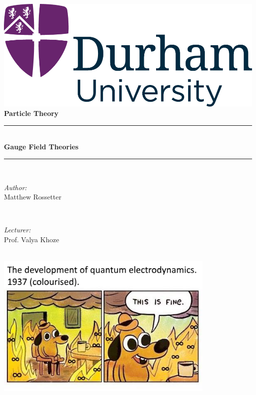 \documentclass[a4paper, 11pt, normalem]{report}
\begin{document}
\begin{titlepage}
    \newcommand{\HRule}{\rule{\linewidth}{0.5mm}}
    \center
    {\includegraphics[scale=0.5]{../../logo0.png}\hfill{\Large\bfseries {}}}\\[2.5cm]
    {\LARGE\bfseries Particle Theory}\\[1.5cm]
    \HRule \\[0.7cm]
    {\huge\bfseries Gauge Field Theories}\\[0.4cm]
    \HRule \\[1.5cm]

    \begin{minipage}{0.4\textwidth}
        \begin{flushleft} \large
            \emph{Author:} \\ Matthew Rossetter
        \end{flushleft}
    \end{minipage}~
    \begin{minipage}{0.4\textwidth}
        \begin{flushright} \large
            \emph{Lecturer:} \\ Prof. Valya Khoze
        \end{flushright}
    \end{minipage}\\[2cm]
    \vfill
    \includegraphics[width=0.8\textwidth]{gauge.png}\\[1cm]
    \vfill
\end{titlepage}
\tableofcontents
\end{document}
